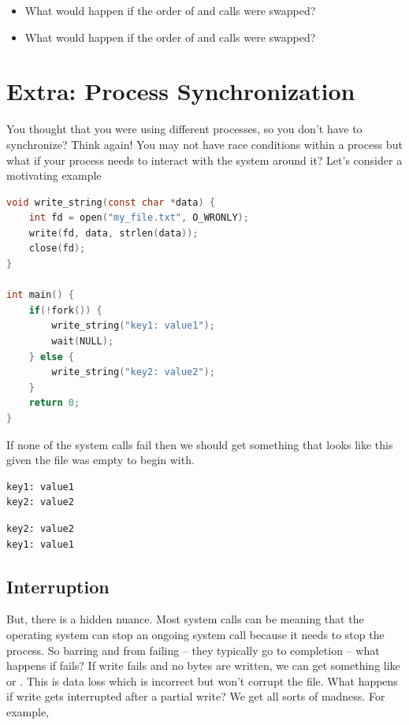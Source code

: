 \begin{itemize}
\tightlist
\item
  What would happen if the order of  and  calls were swapped?
\item
  What would happen if the order of  and  calls were swapped?
\end{itemize}


\section{Extra: Process Synchronization}

You thought that you were using different processes, so you don't have to synchronize?
Think again!
You may not have race conditions within a process but what if your process needs to interact with the system around it?
Let's consider a motivating example

\begin{lstlisting}[language=C]
void write_string(const char *data) {
    int fd = open("my_file.txt", O_WRONLY);
    write(fd, data, strlen(data));
    close(fd);
}

int main() {
    if(!fork()) {
        write_string("key1: value1");
        wait(NULL);
    } else {
        write_string("key2: value2");
    }
    return 0;
}
\end{lstlisting}

If none of the system calls fail then we should get something that looks like this given the file was empty to begin with.

\begin{lstlisting}
key1: value1
key2: value2
\end{lstlisting}

\begin{lstlisting}
key2: value2
key1: value1
\end{lstlisting}

\subsection{Interruption}

But, there is a hidden nuance.
Most system calls can be  meaning that the operating system can stop an ongoing system call because it needs to stop the process.
So barring    and  from failing -- they typically go to completion -- what happens if  fails? If write fails and no bytes are written, we can get something like  or .
This is data loss which is incorrect but won't corrupt the file.
What happens if write gets interrupted after a partial write? We get all sorts of madness.
For example,

